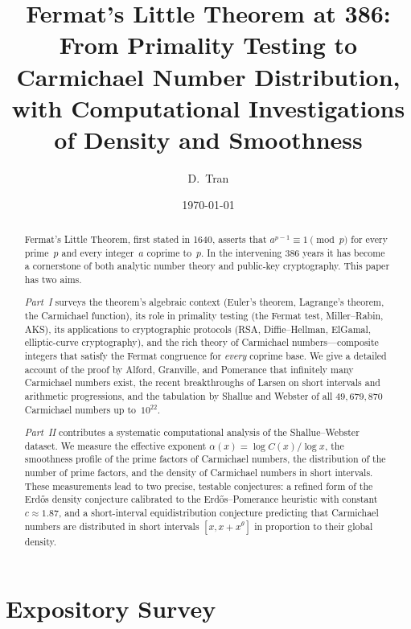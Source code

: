 \documentclass[12pt]{amsart}
\title[Fermat's Little Theorem at 386]{%
  Fermat's Little Theorem at 386:\\
  From Primality Testing to Carmichael Number Distribution,\\
  with Computational Investigations of Density and Smoothness}
\author{D.~Tran}
\date{\today}
\theoremstyle{plain}
\theoremstyle{definition}
\theoremstyle{remark}
\begin{document}
\begin{abstract}
Fermat's Little Theorem, first stated in 1640, asserts that
$a^{p-1}\equiv 1\pmod{p}$ for every prime~$p$ and every integer~$a$
coprime to~$p$.  In the intervening 386 years it has become a
cornerstone of both analytic number theory and public-key
cryptography.  This paper has two aims.

\emph{Part~I} surveys the theorem's algebraic context (Euler's
theorem, Lagrange's theorem, the Carmichael function), its role in
primality testing (the Fermat test, Miller--Rabin, AKS), its
applications to cryptographic protocols (RSA, Diffie--Hellman,
ElGamal, elliptic-curve cryptography), and the rich theory of
Carmichael numbers---composite integers that satisfy the Fermat
congruence for \emph{every} coprime base.  We give a detailed account
of the proof by Alford, Granville, and Pomerance that infinitely many
Carmichael numbers exist, the recent breakthroughs of Larsen on short
intervals and arithmetic progressions, and the tabulation by Shallue
and Webster of all $49{,}679{,}870$ Carmichael numbers up
to~$10^{22}$.

\emph{Part~II} contributes a systematic computational analysis of the
Shallue--Webster dataset.  We measure the effective exponent
$\alpha(x)=\log C(x)/\log x$, the smoothness profile of the prime
factors of Carmichael numbers, the distribution of the number of prime
factors, and the density of Carmichael numbers in short intervals.
These measurements lead to two precise, testable conjectures: a
refined form of the Erd\H{o}s density conjecture calibrated to the
Erd\H{o}s--Pomerance heuristic with constant $c\approx 1.87$, and a
short-interval equidistribution conjecture predicting that Carmichael
numbers are distributed in short intervals $[x,x+x^{\theta}]$ in
proportion to their global density.
\end{abstract}

\maketitle
\tableofcontents


\part{Expository Survey}\label{part:survey}
\end{document}
